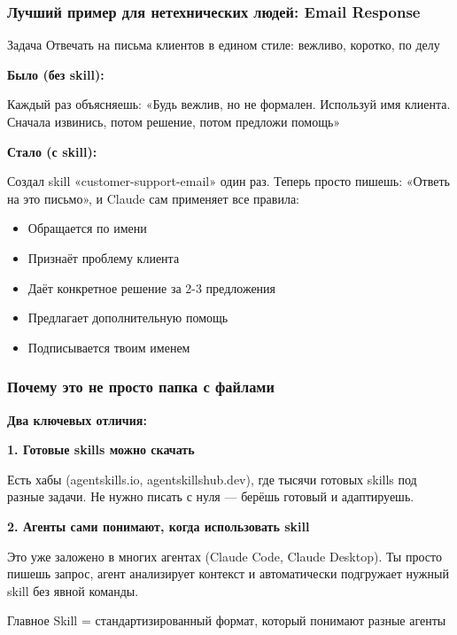 \documentclass[aspectratio=169]{beamer}
\begin{document}

\begin{frame}
\frametitle{Лучший пример для нетехнических людей: Email Response}

\begin{block}{Задача}
Отвечать на письма клиентов в едином стиле: вежливо, коротко, по делу
\end{block}

\vspace{0.3cm}

\textbf{Было (без skill):}

Каждый раз объясняешь: «Будь вежлив, но не формален. Используй имя клиента. Сначала извинись, потом решение, потом предложи помощь»

\vspace{0.5cm}

\textbf{Стало (с skill):}

Создал skill «customer-support-email» один раз. Теперь просто пишешь: «Ответь на это письмо», и Claude сам применяет все правила:

\begin{itemize}
    \item Обращается по имени
    \item Признаёт проблему клиента
    \item Даёт конкретное решение за 2-3 предложения
    \item Предлагает дополнительную помощь
    \item Подписывается твоим именем
\end{itemize}

\end{frame}


\begin{frame}
\frametitle{Почему это не просто папка с файлами}

\textbf{Два ключевых отличия:}

\vspace{0.5cm}

\textbf{1. Готовые skills можно скачать}

Есть хабы (agentskills.io, agentskillshub.dev), где тысячи готовых skills под разные задачи. Не нужно писать с нуля — берёшь готовый и адаптируешь.

\vspace{0.5cm}

\textbf{2. Агенты сами понимают, когда использовать skill}

Это уже заложено в многих агентах (Claude Code, Claude Desktop). Ты просто пишешь запрос, агент анализирует контекст и автоматически подгружает нужный skill без явной команды.

\vspace{0.5cm}

\begin{alertblock}{Главное}
Skill = стандартизированный формат, который понимают разные агенты
\end{alertblock}

\end{frame}
\end{document}
